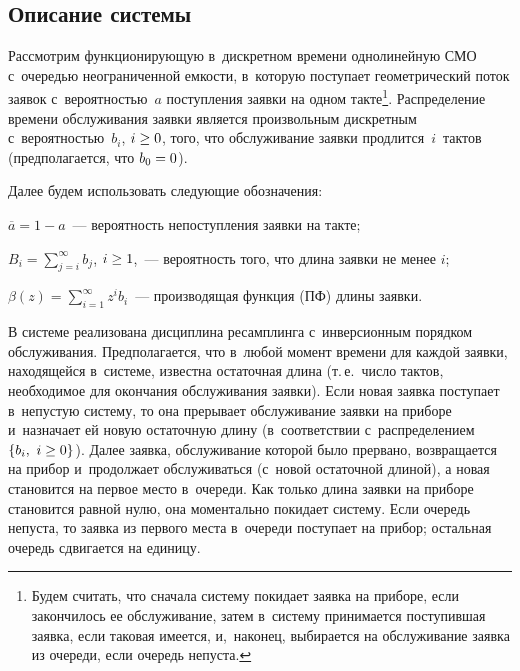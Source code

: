 \begin{multicols}{2}
\vspace*{-6pt}

\section{Описание системы}

\vspace*{-2pt}

Рассмотрим функционирующую в~дискретном времени однолинейную СМО
с~очередью неограниченной емкости,
в~которую поступает геометрический поток заявок
с~вероятностью~$a$ поступления заявки на одном 
такте\footnote[2]{Будем считать, что сначала систему покидает заявка на
приборе, если закончилось ее обслуживание, затем в~систему
принимается поступившая заявка, если таковая имеется, и,~наконец,
выбирается на обслуживание заявка из очереди, если очередь непуста.}.
Распределение времени обслуживания заявки является
произвольным дискретным с~вероятностью~$b_i$, $i \hm\ge 0$, 
того, что обслуживание заявки
продлится~$i$~тактов (предполагается, что $b_0\hm=0$).

Далее будем использовать следующие обозначения:
\begin{description}
\item $\overline{a}=1-a$~--- вероятность непоступления заявки на такте;
\item
$B_i=\sum\nolimits_{j=i}^\infty b_j$, $i \hm\ge 1$,~--- вероятность того, что длина заявки не менее $i$;
\item
$\beta(z)=\sum\nolimits_{i=1}^\infty  z^i b_i$~--- производящая функция (ПФ)
длины заявки.
\end{description}

В системе реализована дисциплина ресамплинга с~инверсионным порядком обслуживания.
Предполагается, что в~любой момент времени для каждой заявки, находящейся в~системе,
известна остаточная длина (т.\,е.\ число тактов, необходимое
для окончания обслуживания заявки).
Если новая заявка поступает в~непустую систему,
то она прерывает обслуживание заявки на приборе 
и~назначает ей новую остаточную длину (в~соответствии с~распределением~$\{b_i, 
\ i\hm\ge 0\}$). Далее заявка,
обслуживание которой было прервано, возвращается на прибор
и~продолжает обслуживаться (с~новой остаточной длиной), а новая
становится на первое место в~очереди.
Как только длина заявки на приборе становится равной нулю,
она моментально покидает систему. Если очередь непуста,
то заявка из первого места в~очереди поступает на прибор;
остальная очередь сдвигается на единицу.


\end{multicols}
